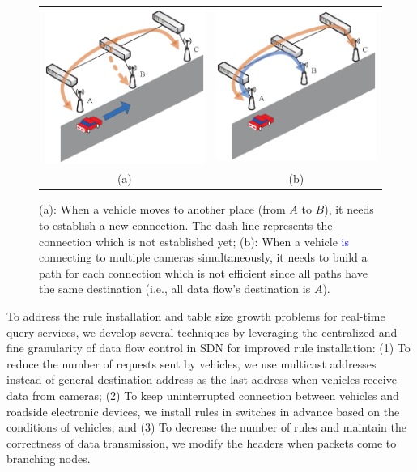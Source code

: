 \documentclass[journal]{IEEEtran}
\begin{document}
\begin{figure} [t]
\begin{center}
\begin{tabular}{cc}
\includegraphics[width=0.48\columnwidth]{fig-1-a-28.eps}&
\includegraphics[width=0.48\columnwidth]{fig-1-b-28.eps} \\
(a) & (b)
\end{tabular}
\caption{(a): When a vehicle moves to another place (from $A$ to $B$), it needs to establish a new connection. The dash line represents the connection which is not established yet; (b): When a vehicle \textcolor{blue}{is} connecting to multiple cameras simultaneously, it needs to build a path for each connection which is not efficient since all paths have the same destination (i.e., all data flow's destination is $A$).} \label{fig1}
  \end{center}
  \vspace{-0.3in}
\end{figure}

To address the rule installation and table size growth problems for real-time query services, we develop several techniques by leveraging the centralized and fine granularity of data flow control in SDN for improved rule installation: (1) To reduce the number of requests sent by vehicles, we use multicast addresses instead of general destination address as the last address when vehicles receive data from cameras; (2) To keep uninterrupted connection between vehicles and roadside electronic devices, we install rules in switches in advance based on the conditions of vehicles; and (3) To decrease the number of rules and maintain the correctness of data transmission, we modify the headers when packets come to branching nodes.
\end{document}
